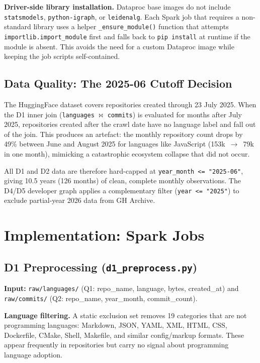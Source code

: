 \documentclass[conference]{IEEEtran}
\begin{document}
\textbf{Driver-side library installation.} Dataproc base images do not
include \texttt{statsmodels}, \texttt{python-igraph}, or \texttt{leidenalg}.
Each Spark job that requires a non-standard library uses a helper
\texttt{\_ensure\_module()} function that attempts \texttt{importlib.import\_module}
first and falls back to \texttt{pip install} at runtime if the module is
absent. This avoids the need for a custom Dataproc image while keeping the
job scripts self-contained.

\subsection{Data Quality: The 2025-06 Cutoff Decision}

The HuggingFace dataset covers repositories created through 23 July 2025.
When the D1 inner join (\texttt{languages} $\bowtie$ \texttt{commits}) is
evaluated for months after July 2025, repositories created after the crawl
date have no language label and fall out of the join. This produces an
artefact: the monthly repository count drops by 49\% between June and August
2025 for languages like JavaScript (153k~$\rightarrow$~79k in one month),
mimicking a catastrophic ecosystem collapse that did not occur.

All D1 and D2 data are therefore hard-capped at \texttt{year\_month <= "2025-06"},
giving 10.5 years (126 months) of clean, complete monthly observations.
The D4/D5 developer graph applies a complementary filter (\texttt{year <= "2025"})
to exclude partial-year 2026 data from GH Archive.

\section{Implementation: Spark Jobs}
\label{sec:implementation}

\subsection{D1 Preprocessing (\texttt{d1\_preprocess.py})}
\label{sec:preprocess}

\textbf{Input:} \texttt{raw/languages/} (Q1: repo\_name, language, bytes,
created\_at) and \texttt{raw/commits/} (Q2: repo\_name, year\_month,
commit\_count).

\textbf{Language filtering.} A static exclusion set removes 19 categories
that are not programming languages: Markdown, JSON, YAML, XML, HTML, CSS,
Dockerfile, CMake, Shell, Makefile, and similar config/markup formats.
These appear frequently in repositories but carry no signal about programming
language adoption.
\end{document}
